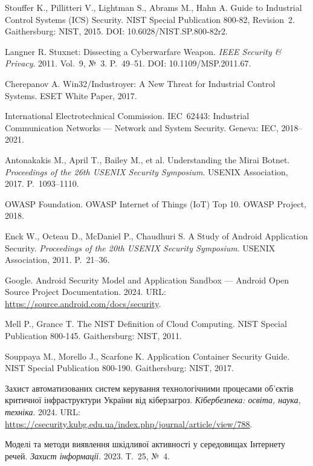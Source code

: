 
 Stouffer K., Pillitteri V., Lightman S., Abrams M., Hahn A. Guide to Industrial Control Systems (ICS) Security. NIST Special Publication 800-82, Revision~2. Gaithersburg: NIST, 2015. DOI: 10.6028/NIST.SP.800-82r2.

 Langner R. Stuxnet: Dissecting a Cyberwarfare Weapon. \emph{IEEE Security \& Privacy}. 2011. Vol.~9, №~3. P.~49--51. DOI: 10.1109/MSP.2011.67.

 Cherepanov A. Win32/Industroyer: A New Threat for Industrial Control Systems. ESET White Paper, 2017.

 International Electrotechnical Commission. IEC~62443: Industrial Communication Networks --- Network and System Security. Geneva: IEC, 2018--2021.

 Antonakakis M., April T., Bailey M., et al. Understanding the Mirai Botnet. \emph{Proceedings of the 26th USENIX Security Symposium}. USENIX Association, 2017. P.~1093--1110.

 OWASP Foundation. OWASP Internet of Things (IoT) Top 10. OWASP Project, 2018.

 Enck W., Octeau D., McDaniel P., Chaudhuri S. A Study of Android Application Security. \emph{Proceedings of the 20th USENIX Security Symposium}. USENIX Association, 2011. P.~21--36.

 Google. Android Security Model and Application Sandbox --- Android Open Source Project Documentation. 2024. URL: \url{https://source.android.com/docs/security}.

 Mell P., Grance T. The NIST Definition of Cloud Computing. NIST Special Publication 800-145. Gaithersburg: NIST, 2011.

 Souppaya M., Morello J., Scarfone K. Application Container Security Guide. NIST Special Publication 800-190. Gaithersburg: NIST, 2017.

 Захист автоматизованих систем керування технологічними процесами об'єктів критичної інфраструктури України від кіберзагроз. \emph{Кібербезпека: освіта, наука, техніка}. 2024. URL: \url{https://csecurity.kubg.edu.ua/index.php/journal/article/view/788}.

 Моделі та методи виявлення шкідливої активності у середовищах Інтернету речей. \emph{Захист інформації}. 2023. Т.~25, №~4.
